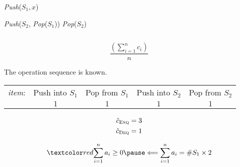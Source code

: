 \begin{frame}{}
  \centerline{}

  \begin{columns}
	  \begin{algorithm}[H]
		\begin{algorithmic}[]
		\State \textsl{Push}($S_1, x$)
		  \EndProcedure

		  \Statex
				\State \textsl{Push}($S_2$, \textsl{Pop}($S_1$))
			  \EndWhile
			\EndIf
			\textsl{Pop}($S_2$)
		  \EndProcedure
		\end{algorithmic}
	  \end{algorithm}
  \end{columns}
\end{frame}

\begin{frame}{}
  \centerline{}

  \vspace{0.30cm}
  \[
    \frac{\left(\sum\limits_{i = 1}^{n} c_i\right)}{n}
  \]

  \pause
  \vspace{0.50cm}
  \centerline{The operation sequence is  known.}
\end{frame}

\begin{frame}{}
  \centerline{}

  \begin{table}
    \begin{tabular}{ccccc}
      {\it item}: & Push into $S_1$ & Pop from $S_1$ & Push into $S_2$ & Pop from $S_2$ \\
      & $1$ & $1$ & $1$ & $1$
    \end{tabular}
  \end{table}

  \pause
  \vspace{-0.60cm}
  \begin{align*}
    \hat{c}_{\textsc{Enq}} &= 3 \\
    \hat{c}_{\textsc{Deq}} &= 1 \\
  \end{align*}

  \pause
  \vspace{-0.60cm}
  \[ 
	\red{\sum_{i=1}^{n} a_i \ge 0} \pause \Longleftarrow \sum_{i=1}^{n} a_i = \#S_1 \times 2
  \]
\end{frame}


